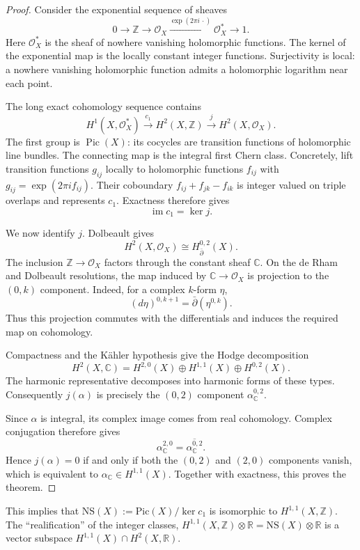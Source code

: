 \begin{proof}
Consider the exponential sequence of
sheaves
$$
0\longrightarrow\mathbb{Z}
\longrightarrow\mathcal{O}_X
\xrightarrow{\exp(2\pi i\,\cdot)}
\mathcal{O}_X^*
\longrightarrow 1.
$$
Here $\mathcal{O}_X^*$ is the sheaf of
nowhere vanishing holomorphic functions.
The kernel of the exponential map is
the locally constant integer functions.
Surjectivity is local: a nowhere
vanishing holomorphic function admits
a holomorphic logarithm near each point.

The long exact cohomology sequence
contains
$$
H^1(X,\mathcal{O}_X^*)
\xrightarrow{c_1}H^2(X,\mathbb{Z})
\xrightarrow{j}H^2(X,\mathcal{O}_X).
$$
The first group is
$\operatorname{Pic}(X)$: its cocycles
are transition functions of holomorphic
line bundles. The connecting map is
the integral first Chern class.
Concretely, lift transition functions
$g_{ij}$ locally to holomorphic
functions $f_{ij}$ with
$g_{ij}=\exp(2\pi i f_{ij})$.
Their coboundary
$f_{ij}+f_{jk}-f_{ik}$ is integer valued
on triple overlaps and represents $c_1$.
Exactness therefore gives
$$
\operatorname{im}c_1=\ker j.
$$

We now identify $j$. Dolbeault gives
$$
H^2(X,\mathcal{O}_X)
\cong H^{0,2}_{\bar\partial}(X).
$$
The inclusion $\mathbb{Z}\to\mathcal{O}_X$
factors through the constant sheaf
$\mathbb{C}$. On the de Rham and
Dolbeault resolutions, the map induced
by $\mathbb{C}\to\mathcal{O}_X$ is
projection to the $(0,k)$ component.
Indeed, for a complex $k$-form $\eta$,
$$
(d\eta)^{0,k+1}
=\bar\partial(\eta^{0,k}).
$$
Thus this projection commutes with the
differentials and induces the required
map on cohomology.

Compactness and the Kähler hypothesis
give the Hodge decomposition
$$
H^2(X,\mathbb{C})
=H^{2,0}(X)\oplus H^{1,1}(X)
\oplus H^{0,2}(X).
$$
The harmonic representative decomposes
into harmonic forms of these types.
Consequently $j(\alpha)$ is precisely
the $(0,2)$ component
$\alpha_{\mathbb{C}}^{0,2}$.

Since $\alpha$ is integral, its complex
image comes from real cohomology.
Complex conjugation therefore gives
$$
\alpha_{\mathbb{C}}^{2,0}
=\overline{\alpha_{\mathbb{C}}^{0,2}}.
$$
Hence $j(\alpha)=0$ if and only if
both the $(0,2)$ and $(2,0)$ components
vanish, which is equivalent to
$\alpha_{\mathbb{C}}\in H^{1,1}(X)$.
Together with exactness, this proves
the theorem.
\end{proof}

\noindent
This implies that
$\text{NS}(X):=\text{Pic}(X)/\ker c_1$
is isomorphic to $H^{1,1}(X,\mathbb{Z})$.
The ``realification'' of the integer classes,
$H^{1,1}(X,\mathbb{Z}) \otimes \mathbb{R}
=\text{NS}(X) \otimes \mathbb{R}$
is a vector subspace
$H^{1,1}(X) \cap H^2(X,\mathbb{R})$.

